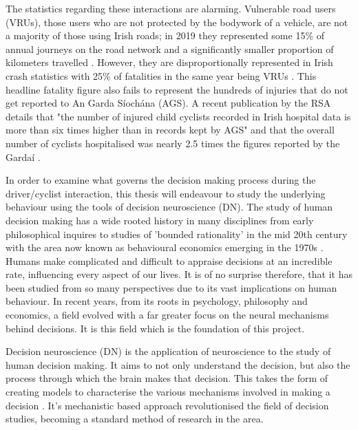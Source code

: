 The statistics regarding these interactions are alarming. Vulnerable road users (VRUs), those users who are not protected by the bodywork of a vehicle, are not a majority of those using Irish roads; in 2019 they represented some 15\% of annual journeys on the road network and a significantly smaller proportion of kilometers travelled \citep{constantProtectingVulnerableRoad2010, departmentoftransportTransportTrends20202020}. However, they are disproportionally represented in Irish crash statistics with 25\% of fatalities in the same year being VRUs \citep{rsaProvisionalReviewFatal2021}. This headline fatality figure also fails to represent the hundreds of injuries that do not get reported to An Garda Síochána (AGS). A recent publication by the RSA details that "the number of injured child cyclists recorded in Irish hospital data is more than six times higher than in records kept by AGS" and that the overall number of cyclists hospitalised was nearly 2.5 times the figures reported by the Gardaí \citep{castelloSeriousInjuriesPedal2023}.

In order to examine what governs the decision making process during the driver/cyclist interaction, this thesis will endeavour to study the underlying behaviour using the tools of decision neuroscience (DN). The study of human decision making has a wide rooted history in many disciplines from early philosophical inquires to studies of 'bounded rationality' in the mid 20th century with the area now known as behavioural economics emerging in the 1970s \citep{jonesBOUNDEDRATIONALITY1999,kaoBehaviouralEconomicsClassical2015}. Humans make complicated and difficult to appraise decisions at an incredible rate, influencing every aspect of our lives. It is of no surprise therefore, that it has been studied from so many perspectives due to its vast implications on human behaviour. In recent years, from its roots in psychology, philosophy and economics, a field evolved with a far greater focus on the neural mechanisms behind decisions. It is this field which is the foundation of this project.

Decision neuroscience (DN) is the application of neuroscience to the study of human decision making. It aims to not only understand the decision, but also the process through which the brain makes that decision. This takes the form of creating models to characterise the various mechanisms involved in making a decision \citep{ratcliffDiffusionDecisionModel2008}. It's mechanistic based approach revolutionised the field of decision studies, becoming a standard method of research in the area.

